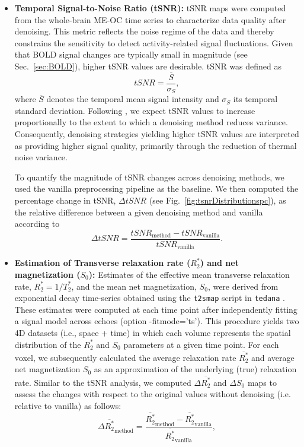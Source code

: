 \begin{itemize}
\item\textbf{Temporal Signal-to-Noise Ratio (tSNR):} tSNR maps were computed from the whole-brain ME-OC time series to characterize data quality after denoising. This metric reflects the noise regime of the data and thereby constrains the sensitivity to detect activity-related signal fluctuations. Given that BOLD signal changes are typically small in magnitude (see Sec.~\ref{sec:BOLD}), higher tSNR values are desirable. tSNR was defined as
\begin{equation}
    tSNR = \frac{\overline{S}}{\sigma_S},
\end{equation}
where $\overline{S}$ denotes the temporal mean signal intensity and $\sigma_S$ its temporal standard deviation. Following \citet{liu2016noise}, we expect tSNR values to increase proportionally to the extent to which a denoising method reduces variance. Consequently, denoising strategies yielding higher tSNR values are interpreted as providing higher signal quality, primarily through the reduction of thermal noise variance.

To quantify the magnitude of tSNR changes across denoising methods, we used the vanilla preprocessing pipeline as the baseline. We then computed the percentage change in tSNR, $\Delta tSNR$ (see Fig.~\ref{fig:tsnrDistributionspc}), as the relative difference between a given denoising method and vanilla according to
\begin{equation}
\Delta tSNR = \frac{tSNR_{\mathrm{method}} - tSNR_{\mathrm{vanilla}}}{tSNR_{\mathrm{vanilla}}}.
\end{equation}


\item\textbf{Estimation of Transverse relaxation rate ($R_{2}^*$) and net magnetization ($S_0$):} Estimates of the effective mean transverse relaxation rate, $R_{2}^{*}=1/T_2^*$, and the mean net magnetization, $S_0$, were derived from exponential decay time-series obtained using the \texttt{t2smap} script in \texttt{tedana} \citep{dupre2021te, kundu2012differentiating}. These estimates were computed at each time point after independently fitting a signal model across echoes (option -fitmode='ts'). This procedure yields two 4D datasets (i.e., space + time) in which each volume represents the spatial distribution of the $R_{2}^{*}$ and $S_0$ parameters at a given time point. For each voxel, we subsequently calculated the average relaxation rate $\overline{R_2^*}$ and average net magnetization $S_0$ as an approximation of the underlying (true) relaxation rate. Similar to the tSNR analysis, we computed $\Delta \overline{R_2^*}$ and $\Delta S_0$ maps to assess the changes with respect to the original values without denoising (i.e. relative to vanilla) as follows:
\begin{equation}
\Delta  \overline{R_{2}^*}_\mathrm{method}= \frac{ \overline{R_{2}^*}_\mathrm{method} - \overline{R_{2}^*}_\mathrm{vanilla}}{\overline{R_{2}^*}_\mathrm{vanilla}}, 
\end{equation}


\end{itemize}
